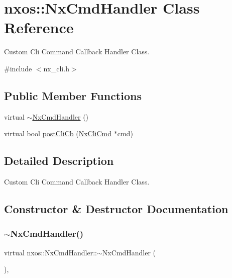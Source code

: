 \hypertarget{classnxos_1_1_nx_cmd_handler}{}\section{nxos\+:\+:Nx\+Cmd\+Handler Class Reference}
\label{classnxos_1_1_nx_cmd_handler}


Custom Cli Command Callback Handler Class.  




{\ttfamily \#include $<$nx\+\_\+cli.\+h$>$}

\subsection*{Public Member Functions}
\begin{DoxyCompactItemize}
\item 
virtual \mbox{\hyperlink{classnxos_1_1_nx_cmd_handler_ae8e41c78decceb133f2d22b516099e55}{$\sim$\+Nx\+Cmd\+Handler}} ()
\item 
virtual bool \mbox{\hyperlink{classnxos_1_1_nx_cmd_handler_ab60a4672e08b1acd1faa249936963ead}{post\+Cli\+Cb}} (\mbox{\hyperlink{classnxos_1_1_nx_cli_cmd}{Nx\+Cli\+Cmd}} $\ast$cmd)
\end{DoxyCompactItemize}


\subsection{Detailed Description}
Custom Cli Command Callback Handler Class. 

\subsection{Constructor \& Destructor Documentation}
\mbox{\label{classnxos_1_1_nx_cmd_handler_ae8e41c78decceb133f2d22b516099e55}} 
\subsubsection{\texorpdfstring{$\sim$\+Nx\+Cmd\+Handler()}{~NxCmdHandler()}}
{\footnotesize\ttfamily virtual nxos\+::\+Nx\+Cmd\+Handler\+::$\sim$\+Nx\+Cmd\+Handler (\begin{DoxyParamCaption}{ }\end{DoxyParamCaption})\hspace{0.3cm}{\ttfamily [inline]}, {\ttfamily [virtual]}}



